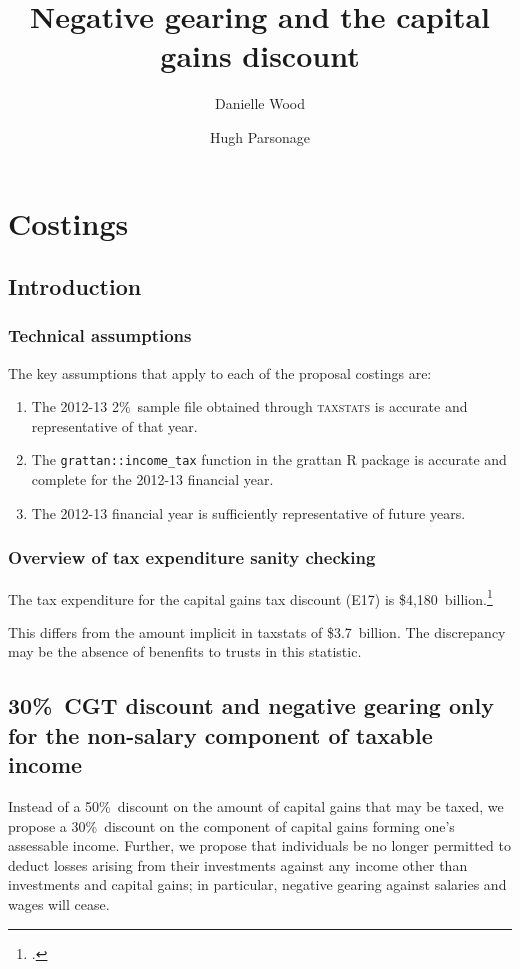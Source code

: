 \documentclass{grattan}\usepackage[]{graphicx}\usepackage[]{color}
\title{Negative gearing and the capital gains discount}
\author{Danielle Wood \and Hugh Parsonage}
\begin{document}
\clearpage





\raggedbottom
\contentspage
\listoffigures
\listoftables

\chapter{Costings}
\section{Introduction}
\subsection{Technical assumptions}
The key assumptions that apply to each of the proposal costings are:
\begin{enumerate}
\item The 2012-13 2\%\ sample file obtained through \textsc{taxstats} is accurate and representative of that year.
\item The \verb=grattan::income_tax= function in the grattan R package is accurate and complete for the 2012-13 financial year.
\item The 2012-13 financial year is sufficiently representative of future years.
\end{enumerate}

\subsection{Overview of tax expenditure sanity checking}
The tax expenditure for the capital gains tax discount (E17) is \$4,180~billion.\footcite{TaxExpenditures201213} 


This differs from the amount implicit in taxstats of \$3.7~billion. The discrepancy may be the absence of benenfits to trusts in this statistic. 

\section{30\%\ CGT discount and negative gearing only for the non-salary component of taxable income}
Instead of a 50\%\ discount on the amount of capital gains that may be taxed, we propose a 30\%\ discount on the component of capital gains forming one's assessable income. Further, we propose that individuals be no longer permitted to deduct losses arising from their investments against any income other than investments and capital gains; in particular, negative gearing against salaries and wages will cease.
\end{document}
